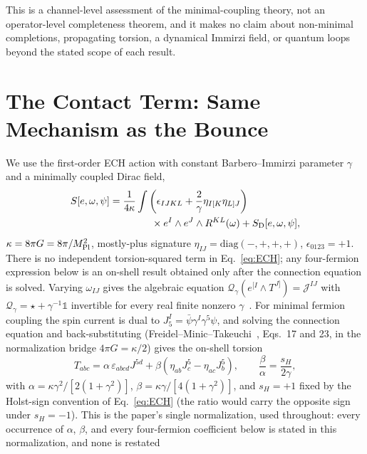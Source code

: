 \documentclass[aps,prd,twocolumn,superscriptaddress,preprintnumbers,nofootinbib,longbibliography,floatfix]{revtex4-2}
\newcommand{\MPl}{M_{\rm Pl}}
\begin{document}
This is a channel-level assessment of the minimal-coupling theory, not an
operator-level completeness theorem, and it makes no claim about
non-minimal completions, propagating torsion, a dynamical Immirzi field,
or quantum loops beyond the stated scope of each result.

\section{The Contact Term: Same Mechanism as the Bounce}\label{sec:theory}

We use the first-order ECH action with constant Barbero--Immirzi parameter
$\gamma$ and a minimally coupled Dirac field,
\begin{align}\label{eq:ECH}
S[e,\omega,\psi] ={}& \frac{1}{4\kappa}\int
\left(\epsilon_{IJKL}+\frac{2}{\gamma}\eta_{I[K}\eta_{L]J}\right)\nonumber\\
&\hspace{1.0cm}\times e^I\wedge e^J\wedge R^{KL}(\omega)
+ S_{\rm D}[e,\omega,\psi],
\end{align}
$\kappa=8\pi G=8\pi/\MPl^2$, mostly-plus signature
$\eta_{IJ}=\mathrm{diag}(-,+,+,+)$, $\epsilon_{0123}=+1$. There is no
independent torsion-squared term in Eq.~\eqref{eq:ECH}; any four-fermion
expression below is an on-shell result obtained only after the connection
equation is solved. Varying $\omega_{IJ}$ gives the algebraic equation
$\mathcal Q_\gamma(e^{[I}\wedge T^{J]})=\mathcal J^{IJ}$ with
$\mathcal Q_\gamma=\star+\gamma^{-1}\mathbb 1$ invertible for every real
finite nonzero $\gamma$~\cite{Freidel2005}. For minimal fermion coupling
the spin current is dual to $J_5^I=\bar\psi\gamma^I\gamma^5\psi$, and
solving the connection equation and back-substituting
(Freidel--Minic--Takeuchi~\cite{Freidel2005}, Eqs.~17 and 23, in the
normalization bridge $4\pi G=\kappa/2$) gives the on-shell torsion
\begin{equation}\label{eq:ech_onshell_torsion}
T_{abc}=\alpha\,\varepsilon_{abcd}J^{5d}
+\beta\left(\eta_{ab}J^5_c-\eta_{ac}J^5_b\right),
\qquad
\frac{\beta}{\alpha}=\frac{s_H}{2\gamma},
\end{equation}
with $\alpha=\kappa\gamma^2/[2(1+\gamma^2)]$,
$\beta=\kappa\gamma/[4(1+\gamma^2)]$, and $s_H=+1$ fixed by the Holst-sign
convention of Eq.~\eqref{eq:ECH} (the ratio would carry the opposite sign
under $s_H=-1$). This is the paper's single normalization, used
throughout: every occurrence of $\alpha$, $\beta$, and every four-fermion
coefficient below is stated in this normalization, and none is restated
\end{document}
